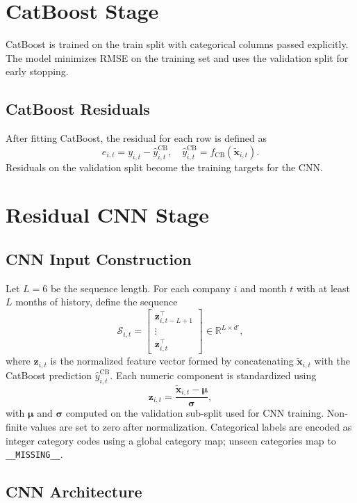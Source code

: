 \documentclass[11pt]{article}
\begin{document}
\section{CatBoost Stage}

CatBoost is trained on the train split with categorical columns passed
explicitly. The model minimizes RMSE on the training set and uses the validation
split for early stopping.

\subsection{CatBoost Residuals}

After fitting CatBoost, the residual for each row is defined as
\[
e_{i,t} = y_{i,t} - \hat{y}^{\text{CB}}_{i,t},
\quad \hat{y}^{\text{CB}}_{i,t} = f_{\text{CB}}(\tilde{\mathbf{x}}_{i,t}).
\]
Residuals on the validation split become the training targets for the CNN.

\section{Residual CNN Stage}

\subsection{CNN Input Construction}

Let $L=6$ be the sequence length. For each company $i$ and month $t$ with at
least $L$ months of history, define the sequence
\[
\mathcal{S}_{i,t} =
\begin{bmatrix}
\mathbf{z}_{i,t-L+1}^\top \\
\vdots \\
\mathbf{z}_{i,t}^\top
\end{bmatrix}
\in \mathbb{R}^{L \times d'},
\]
where $\mathbf{z}_{i,t}$ is the normalized feature vector formed by concatenating
$\tilde{\mathbf{x}}_{i,t}$ with the CatBoost prediction
$\hat{y}^{\text{CB}}_{i,t}$. Each numeric component is standardized using
\[
\mathbf{z}_{i,t} = \frac{\tilde{\mathbf{x}}_{i,t} - \boldsymbol{\mu}}{\boldsymbol{\sigma}},
\]
with $\boldsymbol{\mu}$ and $\boldsymbol{\sigma}$ computed on the validation
sub-split used for CNN training. Non-finite values are set to zero after
normalization. Categorical labels are encoded as integer category codes using a
global category map; unseen categories map to \texttt{\_\_MISSING\_\_}.

\subsection{CNN Architecture}
\end{document}
